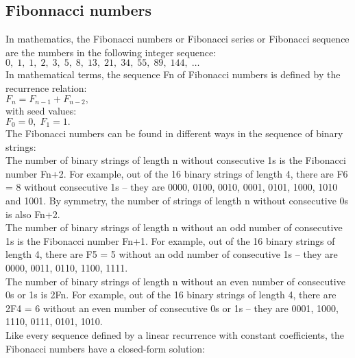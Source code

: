 \documentclass[10pt,letterpaper,twocolumn,twosided]{article}
\newcommand{\codigofuente}[1]{

\dotfill
}
\begin{document}
\codigofuente{src/misc/rationals.cpp}

\subsection{Fibonnacci numbers}

In mathematics, the Fibonacci numbers or Fibonacci series or Fibonacci sequence are the numbers in the following integer sequence:\\

$0,\;1,\;1,\;2,\;3,\;5,\;8,\;13,\;21,\;34,\;55,\;89,\;144,\; \ldots\;$\\

In mathematical terms, the sequence Fn of Fibonacci numbers is defined by the recurrence relation:\\

$F_n = F_{n-1} + F_{n-2},\!\,$\\

with seed values:\\

$F_0 = 0,\; F_1 = 1.$\\

The Fibonacci numbers can be found in different ways in the sequence of binary strings:\\

The number of binary strings of length n without consecutive 1s is the Fibonacci number Fn+2. For example, out of the 16 binary strings of length 4, there are F6 = 8 without consecutive 1s – they are 0000, 0100, 0010, 0001, 0101, 1000, 1010 and 1001. By symmetry, the number of strings of length n without consecutive 0s is also Fn+2.\\

The number of binary strings of length n without an odd number of consecutive 1s is the Fibonacci number Fn+1. For example, out of the 16 binary strings of length 4, there are F5 = 5 without an odd number of consecutive 1s – they are 0000, 0011, 0110, 1100, 1111.\\


The number of binary strings of length n without an even number of consecutive 0s or 1s is 2Fn. For example, out of the 16 binary strings of length 4, there are 2F4 = 6 without an even number of consecutive 0s or 1s – they are 0001, 1000, 1110, 0111, 0101, 1010.\\


Like every sequence defined by a linear recurrence with constant coefficients, the Fibonacci numbers have a closed-form solution:\\
\end{document}
